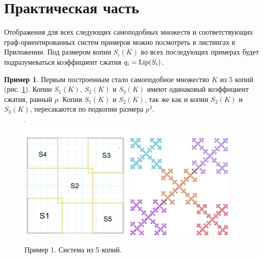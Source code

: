 \documentclass[a4paper,14pt]{extarticle} %
\newcommand{\0}{\varnothing}
\newcommand{\8}{\infty}
\def \Lip  {\mathop{\rm Lip}  \nolimits}
\theoremstyle{definition}
\newtheorem{example}{Пример}
\begin{document}
\newpage
\section{Практическая часть}

Отображения для всех следующих самоподобных множеств и соответствующих граф-ориентированных систем примеров можно посмотреть в листингах в Приложении.
Под размером копии $S_i(K)$ во всех последующих примерах будет подразумеваться коэффициент сжатия $q_i=\Lip(S_i)$.

\begin{example}\label{ex:1}
Первым построенным стало самоподобное множество $K$ из 5 копий (рис. \ref{fig:primer1_skelet}). 
Копии $S_1(K)$, $S_2(K)$ и $S_3(K)$ имеют одинаковый коэффициент сжатия, равный $p$.
Копии $S_1(K)$ и $S_2(K)$, так же как и копии $S_2(K)$ и $S_3(K)$, пересакаются по подкопии размера $p^3$. 

\begin{figure}[H]
    \centering
    \includegraphics[width=0.48\textwidth]{3_2_скелет.png}
    \hfill
    \includegraphics[width=0.45\textwidth]{3_2.png}
    \caption{Пример 1. Система из 5 копий.}
    \label{fig:primer1_skelet}
\end{figure}


\end{example}
\end{document}
